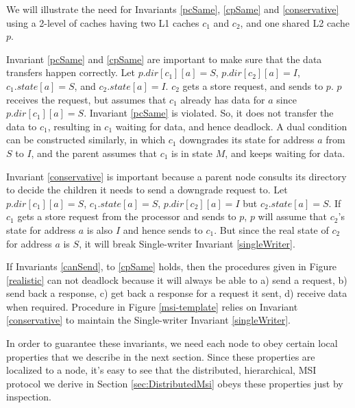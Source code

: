 We will illustrate the need for Invariants \ref{pcSame}, \ref{cpSame} and
\ref{conservative} using a 2-level of caches having two L1 caches $c_1$ and
$c_2$, and one shared L2 cache $p$.

Invariant \ref{pcSame} and \ref{cpSame} are important to make sure that the data
transfers happen correctly. Let $p.dir[c_1][a] = S$, $p.dir[c_2][a] = I$,
$c_1.state[a] = S$, and $c_2.state[a] = I$. $c_2$ gets a store request, and
sends  to $p$. $p$ receives the request, but assumes that
$c_1$ already has data for $a$ since $p.dir[c_1][a] = S$. Invariant \ref{pcSame}
is violated. So, it does not transfer the data to $c_1$, resulting in $c_1$
waiting for data, and hence deadlock. A dual condition can be constructed
similarly, in which $c_1$ downgrades its state for address $a$ from $S$ to $I$,
and the parent assumes that $c_1$ is in state $M$, and keeps waiting for data.

Invariant \ref{conservative} is important because a parent node consults its
directory to decide the children it needs to send a downgrade request to.  Let
$p.dir[c_1][a] = S$, $c_1.state[a] = S$, $p.dir[c_2][a] = I$ but
$c_2.state[a] = S$. If $c_1$ gets a store request from the processor and sends
 to $p$, $p$ will assume that $c_2$'s state for address $a$
is also $I$ and hence sends  to $c_1$. But since the real
state of  $c_2$ for address $a$ is $S$, it will break Single-writer Invariant
\ref{singleWriter}.

If Invariants \ref{canSend}, to \ref{cpSame} holds, then the procedures given in
Figure \ref{realistic} can not deadlock because it will always be able to a)
send a request, b) send back a response, c) get back a response for a request it
sent, d) receive data when required. Procedure \uReq{} in Figure
\ref{msi-template} relies on Invariant \ref{conservative} to maintain the
Single-writer Invariant \ref{singleWriter}.

In order to guarantee these invariants, we need each node to obey certain local
properties that we describe in the next section. Since these properties are
localized to a node, it's easy to see that the distributed, hierarchical, MSI
protocol we derive in Section \ref{sec:DistributedMsi} obeys these properties
just by inspection.
